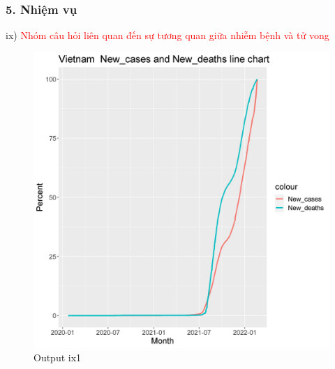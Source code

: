 \documentclass[english,10pt,table]{beamer}
\begin{document}
\begin{frame}[fragile]
\frametitle{5.  Nhiệm vụ}
ix) \textcolor{red}{Nhóm câu hỏi liên quan đến sự tương quan giữa nhiễm bệnh và tử vong}\\
	\begin{figure}[h!]
	\begin{center}
		    \includegraphics[scale = 0.3]{Images/IX/ix1Vietnam.jpeg}
		     \caption{Output ix1}
		\end{center}
		\end{figure}
\end{frame}
\end{document}
